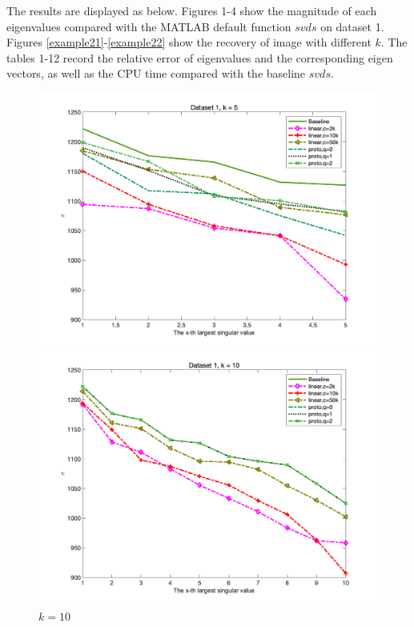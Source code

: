 \documentclass{article}
\begin{document}
The results are displayed as below. Figures 1-4 show the magnitude of each eigenvalues compared with the MATLAB default function $svds$ on dataset 1. Figures \ref{example21}-\ref{example22} show the recovery of image with different $k$. The tables 1-12 record the relative error of eigenvalues and the corresponding eigen vectors, as well as the CPU time compared with the baseline $svds$.
\begin{figure}[p]
	\begin{minipage}{0.54\linewidth}
		\centering
		\includegraphics[width=1\linewidth]{./fig/dataset1_5.png}
		\caption{$k=5$}
	\end{minipage}
	\begin{minipage}{0.54\linewidth}
		\centering
		\includegraphics[width=1\linewidth]{./fig/dataset1_10.png}
		\caption{$k=10$}
	\end{minipage}
\end{figure} 
\end{document}

